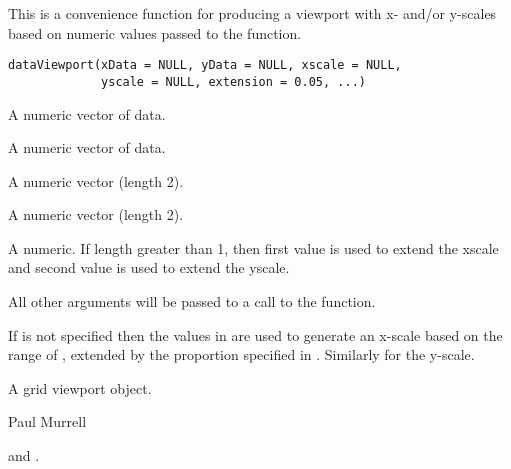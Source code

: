 %
\begin{Description}\relax
This is a convenience function for producing a viewport with
x- and/or y-scales based on numeric values passed to the function.
\end{Description}
%
\begin{Usage}
\begin{verbatim}
dataViewport(xData = NULL, yData = NULL, xscale = NULL,
             yscale = NULL, extension = 0.05, ...)
\end{verbatim}
\end{Usage}
%
\begin{Arguments}
\begin{ldescription}
\item[\code{xData}]  A numeric vector of data. 
\item[\code{yData}]  A numeric vector of data. 
\item[\code{xscale}]  A numeric vector (length 2). 
\item[\code{yscale}]  A numeric vector (length 2). 
\item[\code{extension}]  A numeric.  If length greater than 1, then
first value is used to extend the xscale and second value
is used to extend the yscale.

\item[\code{...}]  All other arguments will be passed to a call to
the  function. 
\end{ldescription}
\end{Arguments}
%
\begin{Details}\relax
If  is not specified then the values in  are
used to generate an x-scale based on the range of , extended
by the proportion specified in .  Similarly for the
y-scale.
\end{Details}
%
\begin{Value}
A grid viewport object.
\end{Value}
%
\begin{Author}\relax
 Paul Murrell 
\end{Author}
%
\begin{SeeAlso}\relax
{} and
.
\end{SeeAlso}
